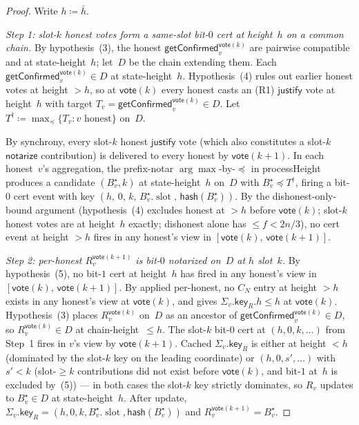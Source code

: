 \documentclass{article}
\newcommand{\slot}[0]{\ensuremath{\operatorname{\mathrm{slot}}}}
\newcommand{\just}{\ensuremath{\mathsf{justify}}\xspace}
\newcommand{\notar}{\ensuremath{\mathsf{notarize}}\xspace}
\newcommand{\hash}{\mathsf{hash}}
\newcommand{\key}{\mathsf{key}}
\newcommand{\vote}{\mathsf{vote}}
\newcommand{\comm}[1]{\bar{#1}}
\newcommand{\processHeight}{\textsf{processHeight}\xspace}
\newcommand{\getConfirmed}{\textsf{getConfirmed}\xspace}
\theoremstyle{plain}
\theoremstyle{definition}
\theoremstyle{remark}
\begin{document}
\begin{proof}
Write $h \coloneqq \comm{h}$.

\emph{Step 1: slot-$k$ honest votes form a same-slot bit-$0$ cert at height~$h$ on a common chain.}
By hypothesis~(3), the honest $\getConfirmed_v^{\vote(k)}$ are pairwise compatible and at state-height~$h$; let~$D$ be the chain extending them. Each $\getConfirmed_v^{\vote(k)} \in D$ at state-height~$h$. Hypothesis~(4) rules out earlier honest votes at height $>h$, so at $\vote(k)$ every honest casts an (R1) \just vote at height~$h$ with target $T_v = \getConfirmed_v^{\vote(k)} \in D$. Let $T^\dagger \coloneqq \max_\preceq \{T_v : v \text{ honest}\}$ on~$D$.

By synchrony, every slot-$k$ honest \just vote (which also constitutes a slot-$k$ \notar contribution) is delivered to every honest by $\vote(k+1)$. In each honest~$v$'s aggregation, the prefix-notar $\arg\max$-by-$\preceq$ in \processHeight{} produces a candidate $(B^\star_v, k)$ at state-height~$h$ on~$D$ with $B^\star_v \preceq T^\dagger$, firing a bit-$0$ cert event with key $(h,\, 0,\, k,\, B^\star_v.\slot,\, \hash(B^\star_v))$. By the dishonest-only-bound argument (hypothesis~(4) excludes honest at $>h$ before $\vote(k)$; slot-$k$ honest votes are at height~$h$ exactly; dishonest alone has $\leq f < 2n/3$), no cert event at height $>h$ fires in any honest's view in $[\vote(k),\, \vote(k+1)]$.

\emph{Step 2: per-honest $R_v^{\vote(k+1)}$ is bit-$0$ notarized on~$D$ at $h$ slot~$k$.}
By hypothesis~(5), no bit-$1$ cert at height~$h$ has fired in any honest's view in $[\vote(k),\, \vote(k+1)]$. By  applied per-honest, no $C_N$ entry at height $>h$ exists in any honest's view at $\vote(k)$, and  gives $\Sigma_v.\key_R.h \leq h$ at $\vote(k)$.
Hypothesis~(3) places $R_v^{\vote(k)}$ on~$D$ as an ancestor of $\getConfirmed_v^{\vote(k)} \in D$, so $R_v^{\vote(k)} \in D$ at chain-height~$\leq h$.
The slot-$k$ bit-$0$ cert at $(h, 0, k, \ldots)$ from Step~1 fires in $v$'s view by $\vote(k+1)$. Cached $\Sigma_v.\key_R$ is either at height $<h$ (dominated by the slot-$k$ key on the leading coordinate) or $(h, 0, s', \ldots)$ with $s' < k$ (slot-$\geq k$ contributions did not exist before $\vote(k)$, and bit-$1$ at~$h$ is excluded by~(5)) — in both cases the slot-$k$ key strictly dominates, so $R_v$ updates to $B^\star_v \in D$ at state-height~$h$. After update, $\Sigma_v.\key_R = (h, 0, k, B^\star_v.\slot, \hash(B^\star_v))$ and $R_v^{\vote(k+1)} = B^\star_v$.


\end{proof}
\end{document}
